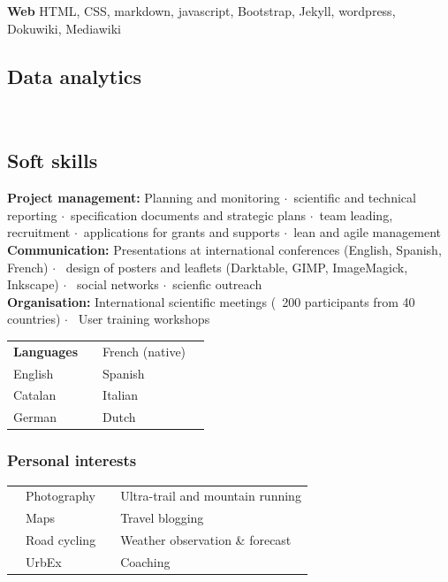 \documentclass[svgnames]{article}
\newcommand{\fourstar}{\footnotesize \textcolor{CVmain}{\faStar\faStar\faStar\faStar}}
\newcommand{\threestar}{\footnotesize \textcolor{CVmain}{\faStar\faStar\faStar}\faStarO}
\newcommand{\twostar}{\footnotesize \textcolor{CVmain}{\faStar\faStar}\faStarO\faStarO}
\newcommand{\onestar}{\footnotesize \textcolor{CVmain}{\faStar}\faStarO\faStarO\faStarO}
\newcommand{\halfstar}{\footnotesize \textcolor{CVmain}{\faStarHalfO}\faStarO\faStarO\faStarO}
\newcommand{\sepa}{$\cdot$~}
\begin{document}
\noindent \textbf{Web} HTML, CSS, markdown, javascript, Bootstrap, Jekyll, wordpress, Dokuwiki, Mediawiki

\subsection*{Data analytics}

     \\ 
    


\subsection*{Soft skills}
\textbf{Project management:} Planning and monitoring \sepa scientific and technical reporting \sepa specification documents and strategic plans \sepa team leading, recruitment \sepa applications for grants and supports \sepa lean and agile management\\
\textbf{Communication:} Presentations at international conferences (English, Spanish, French) $\cdot$~ design of posters and leaflets (Darktable, GIMP, ImageMagick, Inkscape) $\cdot$~ social networks \sepa scienfic outreach\\ 
\textbf{Organisation:} International scientific meetings (~200 participants from 40 countries) $\cdot$~ User	 training workshops\\
\begin{tabularx}{\textwidth}{@{}lrlr @{}}
\textbf{Languages }	& \dotfill	 	& French (native)		& \fourstar \\ 
English 			& \threestar  	& Spanish				& \threestar\\	
Catalan 			& \twostar		& Italian				& \onestar	\\
German				& \onestar		& Dutch 				& \halfstar	\\			
\end{tabularx}


\parbox{.5\textwidth}{
\subsubsection*{Personal interests}
\begin{tabular}{rlrl}
\faCameraRetro	& Photography 				& \faMapSigns 	& Ultra-trail and mountain running	\\ 		
\faMapMarker 	& Maps 						& \faWordpress	&Travel blogging 					\\
\Bicycle		& Road cycling& \faCloud 	& Weather observation \& forecast					\\
\Industry    	& UrbEx 					& 							& Coaching  			\\
\end{tabular}
}
\end{document}
